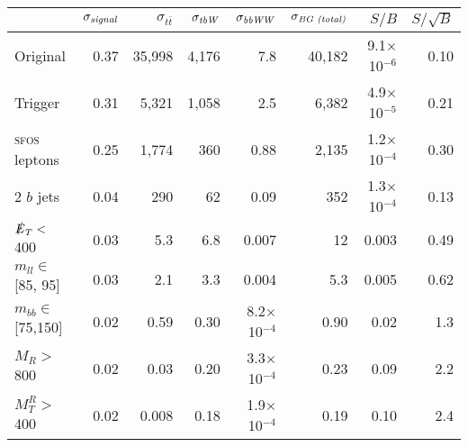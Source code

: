 \begin{tabular}{lrrrrrrr}
\toprule
{} &  $\sigma_\text{\emph{signal}}$ &  $\sigma_{t\overline{t}}$ &  $\sigma_\text{\emph{tbW}}$ &  $\sigma_\text{\emph{bbWW}}$ &  $\sigma_\text{\emph{BG (total)}}$ &   $S/B$ &  $S/\sqrt{B}$ \\
\midrule
Original            & 0.37 & 35,998 & 4,176 & 7.8     & 40,182 & 9.1$\times$ 10$^{-6}$ & 0.10 \\
Trigger             & 0.31 & 5,321  & 1,058 & 2.5     & 6,382  & 4.9$\times$ 10$^{-5}$ & 0.21 \\
\textsc{sfos} leptons        & 0.25 & 1,774  & 360   & 0.88    & 2,135  & 1.2$\times$ 10$^{-4}$ & 0.30 \\
2 $b$ jets          & 0.04 & 290    & 62    & 0.09    & 352    & 1.3$\times$ 10$^{-4}$ & 0.13 \\
$\slashed{E}_T <$ 400         & 0.03 & 5.3    & 6.8   & 0.007   & 12     & 0.003               & 0.49 \\
$m_{ll} \in$ [85, 95]  & 0.03 & 2.1    & 3.3   & 0.004   & 5.3    & 0.005               & 0.62 \\
$m_{bb}\in$ [75,150] & 0.02 & 0.59   & 0.30  & 8.2$\times$ 10$^{-4}$ & 0.90   & 0.02                & 1.3 \\
$M_{R} >$ 800       & 0.02 & 0.03   & 0.20  & 3.3$\times$ 10$^{-4}$ & 0.23   & 0.09                & 2.2 \\
$M_{T}^{R} >$ 400   & 0.02 & 0.008  & 0.18  & 1.9$\times$ 10$^{-4}$ & 0.19   & 0.10                & 2.4 \\
\bottomrule
\end{tabular}
